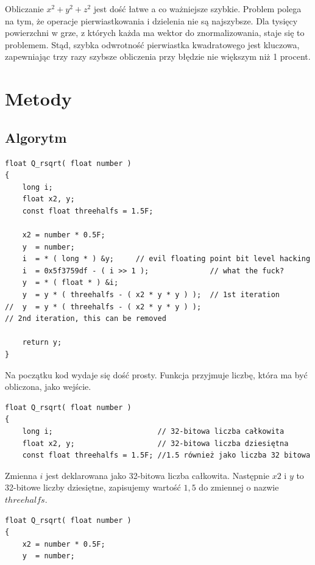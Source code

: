 \documentclass[12pt]{article}
\begin{document}
\noindent Obliczanie $x^2 + y^2 + z^2$ jest dość łatwe a co ważniejsze szybkie. Problem polega na tym, że operacje pierwiastkowania i dzielenia nie są najszybsze.  Dla tysięcy powierzchni w grze, z których każda ma wektor do znormalizowania, staje się to problemem. Stąd, szybka odwrotność pierwiastka kwadratowego jest kluczowa, zapewniając trzy razy szybsze obliczenia przy błędzie nie większym niż 1 procent.

\section{Metody}

\subsection{Algorytm}

\begin{lstlisting}
float Q_rsqrt( float number )
{
    long i;
    float x2, y;
    const float threehalfs = 1.5F;

    x2 = number * 0.5F;
    y  = number;
    i  = * ( long * ) &y;     // evil floating point bit level hacking
    i  = 0x5f3759df - ( i >> 1 );              // what the fuck?
    y  = * ( float * ) &i;
    y  = y * ( threehalfs - ( x2 * y * y ) );  // 1st iteration
//	y  = y * ( threehalfs - ( x2 * y * y ) );  
// 2nd iteration, this can be removed

	return y;
}
\end{lstlisting}

\noindent Na początku kod wydaje się dość prosty. Funkcja przyjmuje liczbę, która ma być obliczona, jako wejście.

\begin{lstlisting}
float Q_rsqrt( float number )
{
    long i;                        // 32-bitowa liczba całkowita
    float x2, y;                   // 32-bitowa liczba dziesiętna
    const float threehalfs = 1.5F; //1.5 również jako liczba 32 bitowa

\end{lstlisting}

 \noindent Zmienna $i$ jest deklarowana jako 32-bitowa liczba całkowita. Następnie $x2$ i $y$ to 32-bitowe liczby dziesiętne, zapisujemy wartość $1,5$ do zmiennej o nazwie $threehalfs$. 

 \begin{lstlisting}
float Q_rsqrt( float number )
{
    x2 = number * 0.5F;
    y  = number;
 

\end{lstlisting}
 	
\end{document}
